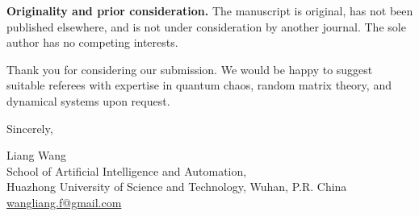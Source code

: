 \documentclass[11pt]{article}
\begin{document}
\vspace{0.4em}

\noindent\textbf{Originality and prior consideration.} The manuscript is original, has not been published elsewhere, and is not under consideration by another journal. The sole author has no competing interests.

\vspace{0.6em}

\noindent Thank you for considering our submission. We would be happy to suggest suitable referees with expertise in quantum chaos, random matrix theory, and dynamical systems upon request.

\vspace{1em}

\noindent Sincerely,

\vspace{0.3em}

\noindent Liang Wang \\
School of Artificial Intelligence and Automation, \\
Huazhong University of Science and Technology, Wuhan, P.R. China \\
\href{mailto:wangliang.f@gmail.com}{wangliang.f@gmail.com}
\end{document}
